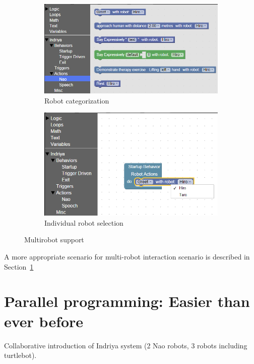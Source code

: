 \begin{figure}[H]
\centering
\begin{subfigure}[t]{0.53\textwidth}
\includegraphics[width=\textwidth]{../thesis/assets/toolbox_multirobot.png}
\caption[Robot categorization]{Robot categorization}
\label{fig:robot_categorize}
\end{subfigure}
\hfill
\begin{subfigure}[t]{0.46\textwidth}
\includegraphics[width=\textwidth]{../thesis/assets/toolbox_multirobot2.png}
\caption[Individual robot selection]{Individual robot selection}
\label{fig:robot_selection}
\end{subfigure}
\caption[Multirobot support]{Multirobot support}
\label{fig:multirobot_support}
\end{figure}

A more appropriate scenario for multi-robot interaction scenario is described in Section~\ref{sec:parallel_programming}

\section{Parallel programming: Easier than ever before}
\label{sec:parallel_programming}
Collaborative introduction of Indriya system (2 Nao robots, 3 robots including turtlebot). 

